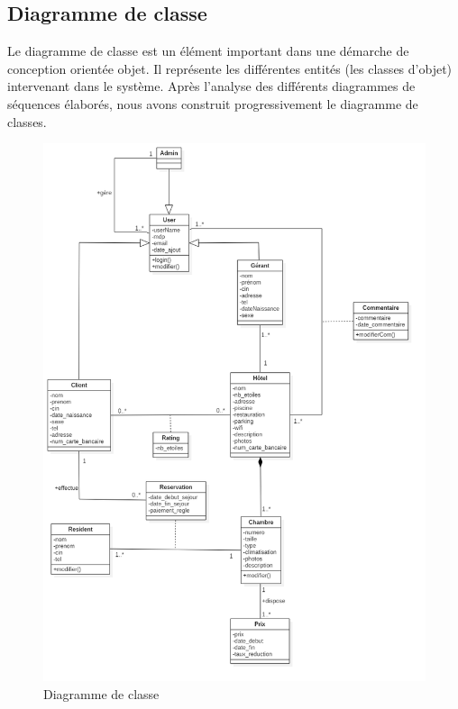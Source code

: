 \documentclass[12pt,a4paper]{report}
\begin{document}
			\subsection{Diagramme de classe}
			Le diagramme de classe est un élément important dans une démarche de conception orientée
			objet. Il représente les différentes entités (les classes d'objet) intervenant dans le système. Après
			l’analyse des différents diagrammes de séquences élaborés, nous avons construit progressivement le
			diagramme de classes.
			\vspace{2cm}
			\begin{figure}[!hbtp]
				\centering
				\includegraphics[scale=0.34]{./graphics/diag_classe.png}
				\caption{Diagramme de classe}
			\end{figure}
			\newpage
		
\end{document}
